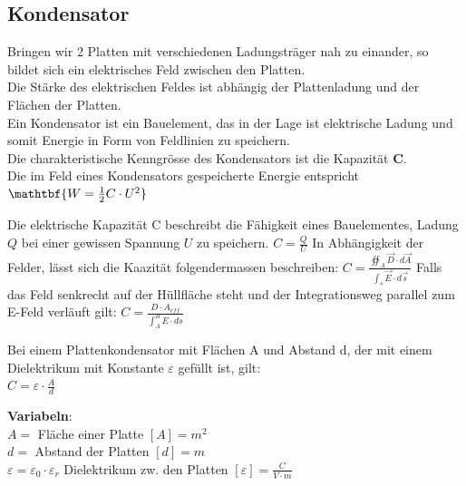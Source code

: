 					\subsection{Kondensator}
					Bringen wir 2 Platten mit verschiedenen Ladungsträger nah zu einander, so bildet sich ein elektrisches Feld zwischen den Platten. \\
					Die Stärke des elektrischen Feldes ist abhängig der Plattenladung und der Flächen der Platten. \\
					\beginip
					Ein Kondensator ist ein Bauelement, das in der Lage ist elektrische Ladung und somit Energie in Form von Feldlinien zu speichern. \\
					Die charakteristische Kenngrösse des Kondensators ist die Kapazität \textbf{C}. \\
					Die im Feld eines Kondensators gespeicherte Energie entspricht $\mathtbf{W = \frac{1}{2} C \cdot U^2}$ \\
					\iend



					\beginip
						Die elektrische Kapazität C beschreibt die Fähigkeit eines Bauelementes, Ladung $Q$ bei einer gewissen Spannung $U$ zu speichern.
						\formulaBegin
						$C =\displaystyle \frac{Q}{U}$
						\formulaEnd
						In Abhängigkeit der Felder, lässt sich die Kaazität folgendermassen beschreiben:
						\formulaBegin
						$ C = \displaystyle \frac{\oiint_A \vec{D} \cdot d \vec{A} }{ \int_s \vec{E} \cdot d\vec{s}}$
						\formulaEnd
						Falls das Feld senkrecht auf der Hüllfläche steht und der Integrationsweg parallel zum E-Feld verläuft gilt:
						\formulaBegin
						$ C= \displaystyle \frac{D \cdot A_{eff} } {\int_A^B E \cdot ds} $
						\formulaEnd
					\iend


					\begingl
					Bei einem Plattenkondensator mit Flächen A und Abstand d, der mit einem Dielektrikum mit Konstante $\varepsilon$ gefüllt ist, gilt: \\
					\formulaBegin
					 $ \displaystyle C = \varepsilon \cdot \frac{A}{ d}$
					\formulaEnd

					\textbf{Variabeln}: \\
					$A = $ Fläche einer Platte $ [A] = m^2 $ \\
					$d = $ Abstand der Platten $ [d] = m$ \\
					$ \varepsilon = \varepsilon_0 \cdot \varepsilon_r $ Dielektrikum zw. den Platten $ [\varepsilon] = \frac{C}{V\cdot m}$ \\

